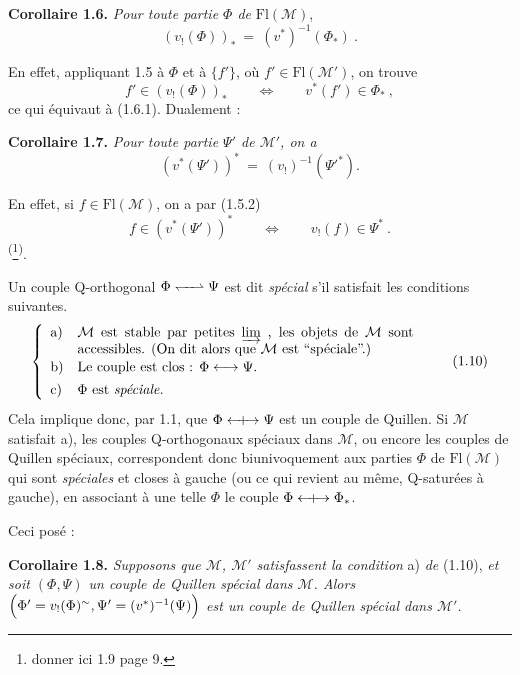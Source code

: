 \documentclass[11pt]{article}
\newcommand{\printedpage}[1]{\marginpar{\footnotesize p.~#1}}
\newcommand{\msp}[1]{\marginpar{\footnotesize [#1]}}
\newcommand{\Qorth}{\mathrel{\leftharpoondown\mkern-6mu\relbar\mkern-6mu\rightharpoonup}}
\newcommand{\Qcouple}{\mathrel{\leftarrow\mkern-9mu{+}\mkern-9mu\rightarrow}}
\newcommand{\clos}{\longleftrightarrow}
\begin{document}
\textbf{Corollaire 1.6.} \textit{Pour toute partie $\Phi$ de} $\mathrm{Fl}(\mathcal{M})$,
\[
(v_{!}(\Phi))_{*} \ =\ (v^{*})^{-1}(\Phi_{*})\ . \tag*{(1.6.1)}
\]

\printedpage{5}

En effet, appliquant 1.5 à $\Phi$ et à $\{f'\}$, où $f' \in \mathrm{Fl}(\mathcal{M}')$, on trouve
\[
f' \in (v_{!}(\Phi))_{*} \qquad \Longleftrightarrow \qquad v^{*}(f') \in \Phi_{*}\ ,
\]
ce qui équivaut à (1.6.1). Dualement :

\textbf{Corollaire 1.7.} \textit{Pour toute partie $\Psi'$ de $\mathcal{M}'$, on a}
\[
(v^{*}(\Psi'))^{*} \ =\ (v_{!})^{-1}(\Psi'^{*}). \tag*{(1.7.1)}
\]

En effet, si $f \in \mathrm{Fl}(\mathcal{M})$, on a par (1.5.2)
\[
f \in (v^{*}(\Psi'))^{*} \qquad \Longleftrightarrow \qquad v_{!}(f) \in \Psi^{*}\ . %
\]
\textsuperscript{(}\footnote[3]{donner ici 1.9 page 9.}\textsuperscript{)}.

\msp{page 8}
Un couple Q-orthogonal $\Phi \Qorth \Psi$ est dit \textit{spécial} s'il satisfait les conditions suivantes.
\[
\left\{
\begin{array}{ll}
\text{a)} & \parbox[t]{0.7\textwidth}{$\mathcal{M}$ est stable par petites $\varinjlim$ , les objets de $\mathcal{M}$ sont accessibles. (On dit alors que $\mathcal{M}$ est “spéciale”.)} \\[3ex]
\text{b)} & \text{Le couple est clos : } \Phi \clos \Psi. \\[1ex]
\text{c)} & \Phi \text{ est \textit{spéciale.}}
\end{array}
\right.
\tag*{(1.10)}
\]
Cela implique donc, par 1.1, que $\Phi \Qcouple \Psi$ est un couple de Quillen. Si $\mathcal{M}$ satisfait a), les couples Q-orthogonaux spéciaux dans $\mathcal{M}$, ou encore les couples de Quillen spéciaux, correspondent donc biunivoquement aux parties $\Phi$ de $\mathrm{Fl}(\mathcal{M})$ qui sont \textit{spéciales} et closes à gauche (ou ce qui revient au même, Q-saturées à gauche), en associant à une telle $\Phi$ le couple $\Phi \Qcouple \Phi_{*}$.

Ceci posé :

\marginpar{$\Vert$}%
\textbf{Corollaire 1.8.} \textit{Supposons que $\mathcal{M}$, $\mathcal{M}'$ satisfassent la condition} a) \textit{de} (1.10), \textit{et soit $(\Phi, \Psi)$ un couple de Quillen spécial dans $\mathcal{M}$. Alors $\Bigl(\Phi' = v_{!}(\Phi)^{\sim}, \Psi' = (v^{*})^{-1}(\Psi)\Bigr)$ est un couple de Quillen spécial dans $\mathcal{M}'$.}
\end{document}
